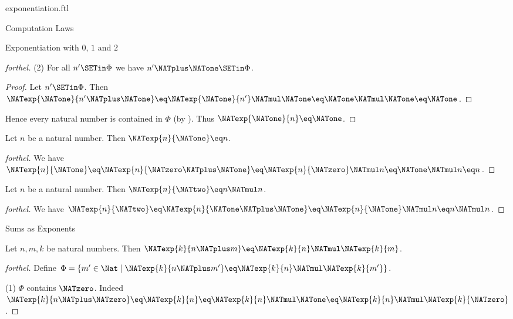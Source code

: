 \documentclass{stex}
\begin{document}
\begin{smodule}{exponentiation.ftl}
\begin{sfragment}{Computation Laws}
\begin{sfragment}{Exponentiation with $0$, $1$ and $2$}
\begin{proof}[forthel]
      (2) For all $n' \SETin \Phi$ we have $n' \NATplus \NATone \SETin \Phi$.
      \begin{proof}
        Let $n' \SETin \Phi$.
        Then $\NATexp{\NATone}{n' \NATplus \NATone}
          \eq \NATexp{\NATone}{n'} \NATmul \NATone
          \eq \NATone \NATmul \NATone
          \eq \NATone$.
      \end{proof}

      Hence every natural number is contained in $\Phi$ (by ).
      Thus $\NATexp{\NATone}{n} \eq \NATone$.
    \end{proof}

    \begin{proposition}[forthel,id=ARITHMETIC_09_4975279749464064]
      Let $n$ be a natural number.
      Then $\NATexp{n}{\NATone} \eq n$.
    \end{proposition}
    \begin{proof}[forthel]
      We have $\NATexp{n}{\NATone}
        \eq \NATexp{n}{\NATzero \NATplus \NATone}
        \eq \NATexp{n}{\NATzero} \NATmul n
        \eq \NATone \NATmul n
        \eq n$.
    \end{proof}

    \begin{proposition}[forthel,id=ARITHMETIC_09_8513812055457792]
      Let $n$ be a natural number.
      Then $\NATexp{n}{\NATtwo} \eq n \NATmul n$.
    \end{proposition}
    \begin{proof}[forthel]
      We have $\NATexp{n}{\NATtwo}
        \eq \NATexp{n}{\NATone \NATplus \NATone}
        \eq \NATexp{n}{\NATone} \NATmul n
        \eq n \NATmul n$.
    \end{proof}
  \end{sfragment}

  \begin{sfragment}{Sums as Exponents}
    \begin{proposition}[forthel,id=ARITHMETIC_09_8152207530655744]
      Let $n, m, k$ be natural numbers.
      Then $\NATexp{k}{n \NATplus m} \eq \NATexp{k}{n} \NATmul \NATexp{k}{m}$.
    \end{proposition}
    \begin{proof}[forthel]
      Define $\Phi = \{ m' \in \Nat \mid \NATexp{k}{n \NATplus m'} \eq \NATexp{k}{n} \NATmul \NATexp{k}{m'} \}$.

      (1) $\Phi$ contains $\NATzero$.
      Indeed $\NATexp{k}{n \NATplus \NATzero}
        \eq \NATexp{k}{n}
        \eq \NATexp{k}{n} \NATmul \NATone
        \eq \NATexp{k}{n} \NATmul \NATexp{k}{\NATzero}$.


\end{proof}
\end{sfragment}
\end{sfragment}
\end{smodule}
\end{document}
